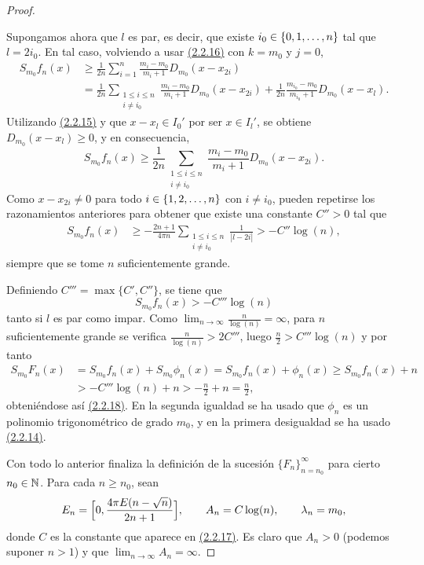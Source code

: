 \documentclass[a4paper, 12pt, oneside]{book}
\begin{document}
\begin{proof}
\begin{itemize}
        Supongamos ahora que $l$ es par, es decir, que existe $i_0 \in \{0,1,\mathellipsis,n\}$ tal que $l = 2i_0$. En tal caso, volviendo a usar \hyperref[2.2.16]{\color{blue}(2.2.16)} con $k = m_0$ y $j = 0$,
        \begin{align*}
            S_{m_0}f_n(x) &\geq \frac{1}{2n}\sum_{i=1}^n \frac{m_i-m_0}{m_i+1}D_{m_0}(x-x_{2i}) \\
            &=\frac{1}{2n}\sum_{\substack{1 \leq i \leq n \\ i \neq i_0}} \frac{m_i-m_0}{m_i+1}D_{m_0}(x-x_{2i})+\frac{1}{2n}\frac{m_{i_0}-m_0}{m_{i_0}+1}D_{m_0}(x-x_l).
        \end{align*}
        Utilizando \hyperref[2.2.15]{\color{blue}(2.2.15)} y que $x-x_l \in I_0'$ por ser $x \in I_l'$, se obtiene $D_{m_0}(x-x_l) \geq 0$, y en consecuencia,
        \[S_{m_0}f_n(x) \geq \frac{1}{2n}\sum_{\substack{1 \leq i \leq n \\ i \neq i_0}} \frac{m_i-m_0}{m_i+1}D_{m_0}(x-x_{2i}).\]
        Como $x-x_{2i} \neq 0$ para todo $i \in \{1,2,\mathellipsis,n\}$ con $i \neq i_0$, pueden repetirse los razonamientos anteriores para obtener que existe una constante $C'' > 0$ tal que
        \begin{align*}
            S_{m_0}f_n(x) &\geq -\frac{2n+1}{4\pi n}\sum_{\substack{1 \leq i \leq n \\ i \neq i_0}} \frac{1}{|l-2i|} > -C''\log(n),
        \end{align*}
        siempre que se tome $n$ suficientemente grande.

        Definiendo $C''' = \max\{C',C''\}$, se tiene que 
        \[S_{m_0}f_n(x) > -C'''\log(n)\] tanto si $l$ es par como impar. Como $\lim_{n \to \infty} \frac{n}{\log(n)} = \infty$, para $n$ suficientemente grande se verifica $\frac{n}{\log(n)}>2C'''$,
        luego $\frac{n}{2} > C'''\log(n)$ y por tanto 
        \begin{align*}
            S_{m_0}F_n(x) &= S_{m_0}f_n(x)+S_{m_0}\phi_n(x) = S_{m_0}f_n(x)+\phi_n(x) \geq S_{m_0}f_n(x)+n \\
            &> -C'''\log(n)+n > -\frac{n}{2}+n = \frac{n}{2},
        \end{align*}
        obteniéndose así \hyperref[2.2.18]{\color{blue}(2.2.18)}. En la segunda igualdad se ha usado que $\phi_n$ es un polinomio trigonométrico de grado $m_0$, y en la primera desigualdad se ha usado \hyperref[2.2.14]{\color{blue}(2.2.14)}.
    \end{itemize}

    Con todo lo anterior finaliza la definición de la sucesión $\{F_n\}_{n=n_0}^\infty$ para cierto $n_0\in\mathbb N$. Para cada $n \geq n_0$, sean
    \[E_n = \Bigl[0, \frac{4\pi E(n-\sqrt{n})}{2n+1}\Bigr], \qquad A_n = C\log(n), \qquad \lambda_n = m_0,\]
    donde $C$ es la constante que aparece en \hyperref[2.2.17]{\color{blue}(2.2.17)}. Es claro que $A_n > 0$ (podemos suponer $n>1$) y que $\lim_{n \to \infty} A_n = \infty$.
    

\end{proof}
\end{document}
